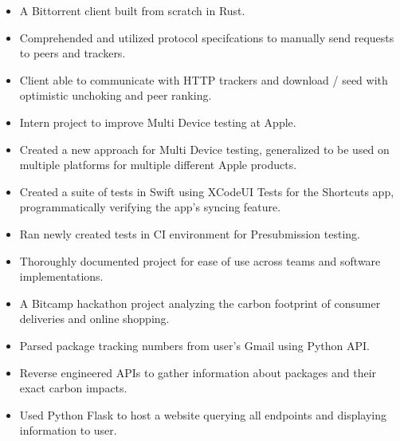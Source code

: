 \documentclass[11pt]{article}
\begin{document}
{\vspace{-2mm}
\hsep


\vspace{2mm}
\begin{itemize}[noitemsep,nolistsep]
    \item A Bittorrent client built from scratch in {\robotocond Rust}.
    \item Comprehended and utilized protocol specifcations to manually send requests to peers and trackers.
    \item Client able to communicate with HTTP trackers and download / seed with optimistic unchoking and peer ranking.
\end{itemize}
\begin{itemize}[noitemsep,nolistsep]
    \item Intern project to improve Multi Device testing at Apple. 
    \item Created a new approach for Multi Device testing, generalized to be used on multiple platforms for multiple different Apple products. 
    \item Created a suite of tests in {\robotocond Swift} using {\robotocond XCodeUI Tests} for the Shortcuts app, programmatically verifying the app's syncing feature.
    \item Ran newly created tests in CI environment for Presubmission testing.
    \item Thoroughly documented project for ease of use across teams and software implementations.
\end{itemize}

\begin{itemize}[noitemsep,nolistsep]
    \item A Bitcamp hackathon project analyzing the carbon footprint of consumer deliveries and online shopping. 
    \item Parsed package tracking numbers from user's Gmail using {\robotocond Python} API. 
    \item Reverse engineered APIs to gather information about packages and their exact carbon impacts. 
    \item Used {\robotocond Python Flask} to host a website querying all endpoints and displaying information to user.
\end{itemize}
}
\end{document}

